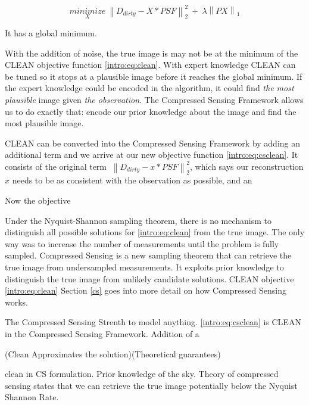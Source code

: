 \begin{equation}\label{intro:eq:csclean}
\underset{X}{minimize} \: \left \| D_{dirty} -X \ast PSF \right \|_2^2 \: + \: \lambda \left \| PX \right \|_1
\end{equation}

It has a global minimum.

With the addition of noise, the true image is may not be at the minimum of the CLEAN objective function \eqref{intro:eq:clean}. With expert knowledge CLEAN can be tuned so it stops at a plausible image before it reaches the global minimum. If the expert knowledge could be encoded in the algorithm, it could find \textit{the most plausible} image given \textit{the observation}. The Compressed Sensing Framework allows us to do exactly that: encode our prior knowledge about the image and find the most plausible image.


CLEAN  can be converted into the Compressed Sensing Framework by adding an additional term and we arrive at our new objective function \eqref{intro:eq:csclean}. It consists of the original term $\: \left \| D_{dirty} - x \ast PSF \right \|_2^2$, which says our reconstruction $x$ needs to be as consistent with the observation as possible, and an 



Now the objective 



Under the Nyquist-Shannon sampling theorem, there is no mechanism to distinguish all possible solutions for \eqref{intro:eq:clean} from the true image. The only way was to increase the number of measurements until the problem is fully sampled. Compressed Sensing\cite{candes2006robust}\cite{donoho2006compressed} is a new sampling theorem that can retrieve the true image from undersampled measurements. It exploits prior knowledge to distinguish the true image from unlikely candidate solutions. CLEAN objective \eqref{intro:eq:clean} Section \ref{cs} goes into more detail on how Compressed Sensing works.



The 
Compressed Sensing Strenth to model anything. \eqref{intro:eq:csclean} is CLEAN in the Compressed Sensing Framework. Addition of a 






(Clean Approximates the solution)(Theoretical guarantees)

clean in CS formulation. Prior knowledge of the sky. Theory of compressed sensing states that we can retrieve the true image potentially below the Nyquist Shannon Rate.

